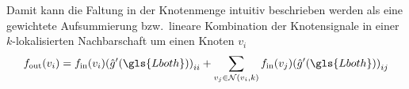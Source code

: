 Damit kann die Faltung in der Knotenmenge intuitiv beschrieben werden als eine gewichtete Aufsummierung bzw.\ lineare Kombination der Knotensignale in einer $k$-lokalisierten Nachbarschaft um einen Knoten $v_i$
\begin{equation}
  f_{\mathrm{out}}\left(v_i\right) = f_{\mathrm{in}}\left(v_i\right) {\left(\hat g^{\prime}\left(\gls{Lboth}\right)\right)}_{ii} + \sum_{v_j \in \mathcal{N}\left(v_i, k\right)} f_{\mathrm{in}}\left(v_j\right) {\left(\hat g^{\prime}\left(\gls{Lboth}\right)\right)}_{ij}
\end{equation}

